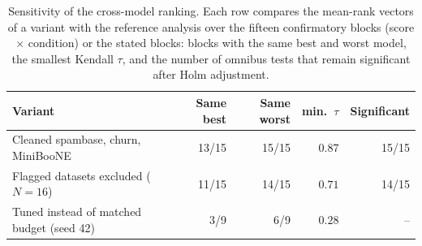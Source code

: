 \begin{table}[t]
\centering
\footnotesize
\caption{Sensitivity of the cross-model ranking. Each row compares the mean-rank vectors of a variant with the reference analysis over the fifteen confirmatory blocks (score $\times$ condition) or the stated blocks: blocks with the same best and worst model, the smallest Kendall $\tau$, and the number of omnibus tests that remain significant after Holm adjustment.}
\label{tab:sensitivity}
\begin{tabular}{@{}p{4.6cm}rrrr@{}}
\toprule
Variant & Same best & Same worst & min.\ $\tau$ & Significant \\
\midrule
Cleaned spambase, churn, MiniBooNE & 13/15 & 15/15 & $0.87$ & 15/15 \\
Flagged datasets excluded ($N=16$) & 11/15 & 14/15 & $0.71$ & 14/15 \\
Tuned instead of matched budget (seed 42) & 3/9 & 6/9 & $0.28$ & -- \\
\bottomrule
\end{tabular}
\end{table}
